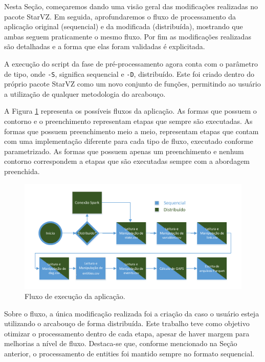 Nesta Seção, começaremos dando uma visão geral das modificações realizadas no 
pacote StarVZ. Em seguida, aprofundaremos o fluxo de processamento da aplicação 
original (sequencial) e da modificada (distribuída), mostrando que ambas seguem 
praticamente o mesmo fluxo. Por fim as modificações realizadas são detalhadas e 
a forma que elas foram validadas é explicitada.

A execução do script da fase de pré-processamento agora conta com o parâmetro de 
tipo, onde \texttt{-S}, significa sequencial e \texttt{-D}, distribuído. Este 
foi criado dentro do próprio pacote StarVZ como um novo conjunto de funções, 
permitindo ao usuário a utilização de qualquer metodologia do arcabouço.

A Figura \ref{fig:spark-starvz-flow} representa os possíveis fluxos da 
aplicação.  As formas que possuem o contorno  e o preenchimento 
 representam etapas que sempre são executadas. As formas que possuem 
preenchimento meio a meio, representam etapas que contam com uma implementação 
diferente para cada tipo de fluxo, executado conforme parametrizado. As formas 
que possuem apenas um preenchimento e nenhum contorno correspondem a etapas que 
são executadas sempre com a abordagem preenchida.

\begin{figure}[H]
 \centerline{\includegraphics[width=1\textwidth]{./img/applicationflow.pdf}}
 \caption{Fluxo de execução da aplicação.}
 \label{fig:spark-starvz-flow}
\end{figure}

Sobre o fluxo, a única modificação realizada foi a criação da  
caso o usuário esteja utilizando o arcabouço de forma distribuída. Este 
trabalho teve como objetivo otimizar o processamento dentro de cada 
etapa, apesar de haver margem para melhorias a nível de fluxo. 
Destaca-se que, conforme mencionado na Seção anterior, o processamento de 
entities foi mantido sempre no formato sequencial.

